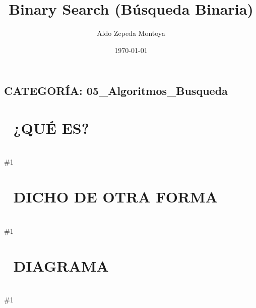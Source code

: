 \documentclass{article}
\newcommand{\quees}[1]{
    \section*{🤔 ¿QUÉ ES?}
    \hrulefill \\
    \#1
}
\newcommand{\dichodeotraforma}[1]{
    \section*{💬 DICHO DE OTRA FORMA}
    \hrulefill \\
    \#1
}
\newcommand{\diagrama}[1]{
    \section*{🎨 DIAGRAMA}
    \hrulefill \\
    \#1
}
\begin{document}
\title{Binary Search (Búsqueda Binaria)}
\author{Aldo Zepeda Montoya}
\date{\today}
\maketitle

\subsection*{CATEGORÍA: 05\_Algoritmos\_Busqueda}

\quees{
El juego de adivinar el número 🔢 entre 1 y 100. 

Dices "50" y te dicen: "¡Más alto!". 
Ahora sabes que el número NO está entre 1 y 50. ¡Acabas de descartar 
la MITAD de las posibilidades en un solo paso! 

Luego dices "75", te dicen: "¡Más bajo!". 
Ahora sabes que está entre 51 y 74. Vuelves a descartar la mitad.

En solo 7 intentos puedes adivinar cualquier número entre 128 opciones. 
Es increíblemente rápido porque el problema se encoge 
exponencialmente en cada paso.
}

\dichodeotraforma{
Binary Search es un algoritmo de búsqueda eficiente que funciona sobre
un conjunto de datos ORDENADO. 

En lugar de revisar uno por uno, siempre revisa el elemento del medio. 
Si el objetivo es menor al medio, busca en la mitad izquierda. Si es 
mayor, busca en la derecha. 

Este enfoque de "Divide y Vencerás" reduce la complejidad de tiempo
a O(log n), lo cual es ideal para datasets masivos.
}

\diagrama{\begin{verbatim}
Buscar 23 en array ordenado:
[1, 3, 5, 7, 9, 11, 13, 15, 17, 19, 21, 23, 25]
 idx: 0  1  2  3  4   5   6   7   8   9  10  11  12

Paso 1: izq=0, der=12, mid=6.
        arr[6] es 13. ¿13 < 23? SÍ.
        Nuevo rango: [7...12] (la derecha)

Paso 2: izq=7, der=12, mid=9.
        arr[9] es 19. ¿19 < 23? SÍ.
        Nuevo rango: [10...12]

Paso 3: izq=10, der=12, mid=11.
        arr[11] es 23. ¿23 == 23? ¡SÍ! 🎉 🎉

Solo 3 pasos para 13 elementos.
\end{verbatim}}
\end{document}
